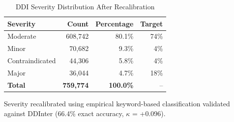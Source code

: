 \begin{table}[htbp]
\centering
\caption{DDI Severity Distribution After Recalibration}
\label{tab:severity_distribution}
\begin{tabular}{lrrr}
\toprule
\textbf{Severity} & \textbf{Count} & \textbf{Percentage} & \textbf{Target} \\
\midrule
Moderate & 608,742 & 80.1\% & 74\% \\
Minor & 70,682 & 9.3\% & 4\% \\
Contraindicated & 44,306 & 5.8\% & 4\% \\
Major & 36,044 & 4.7\% & 18\% \\
\midrule
\textbf{Total} & \textbf{759,774} & \textbf{100.0\%} & -- \\
\bottomrule
\end{tabular}
\begin{tablenotes}
\small
\item Severity recalibrated using empirical keyword-based classification validated against DDInter (66.4\% exact accuracy, $\kappa$ = +0.096).
\end{tablenotes}
\end{table}
